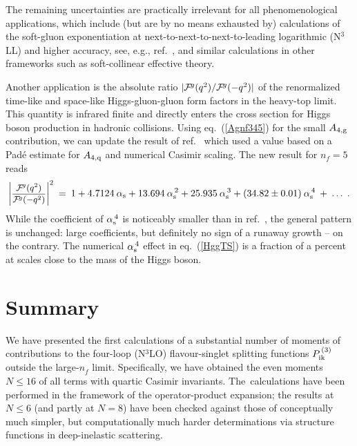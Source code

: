 \documentclass[12pt]{article}
\newcommand{\beq}{\begin{equation}}
\newcommand{\eeq}{\end{equation}}
\newcommand{\als}{\alpha_{\rm s}}
\def\frct#1#2{\mbox{\small{$\displaystyle\frac{#1}{#2}$}}}
\def\as(#1){{\alpha_{\rm s}^{\,#1}}}
\def\nf{{n^{}_{\! f}}}
\begin{document}
The remaining uncertainties are practically irrelevant for all phenomenological
applications, which include (but are by no means exhausted by) calculations of 
the soft-gluon exponentiation at  next-to-next-to-next-to-leading logarithmic 
(N$^3$LL) \cite{n3llSGE} and higher accuracy, see, e.g., ref.~\cite{dFMMV}, 
and similar calculations in other frameworks such as soft-collinear 
effective theory.
 
Another application is the absolute ratio
$|{\cal F}^{\! g}(q^2)/{\cal F}^{\! g}(-q^2)|$ of the renormalized time-like
and space-like Higgs-gluon-gluon form factors in the heavy-top limit. 
This quantity is infrared finite and directly enters the cross section for 
Higgs boson production in hadronic collisions. 
Using eq.~(\ref{Agnf345}) for the small $A_{4,\rm g}$ contribution, we can 
update the result of ref.~\cite{MVV9} which used a value based on a Pad\'e 
estimate for $A_{4,\rm q}$ and numerical Casimir scaling. 
The new result for $n_{\!f} = 5$ reads
%
\beq
\label{HggTS}
  \bigg| \frct{{\cal F}^{\! g}(q^2)}{{\cal F}^{\! g}(-q^2)} \bigg|^2 
  \: = \:
        1 + 4.7124\: \als   + 13.694\: \as(2)
          + 25.935\: \as(3) + (34.82 \pm 0.01)\: \as(4) 
          \:+\: \ldots
\; .
\eeq
%
While the coefficient of $\as(4)$ is noticeably smaller than in 
ref.~\cite{MVV9}, the general pattern is unchanged: large coefficients, 
but definitely no sign of a runaway growth -- on the contrary.
The numerical $\as(4)$ effect in eq.~(\ref{HggTS}) is a fraction of a 
percent at scales close to the mass of the Higgs boson.


%
\setcounter{equation}{0}
\section{Summary}
\label{sec:summ}
\vspace*{-1mm}

We have presented the first calculations of a substantial number of moments 
of contributions to the four-loop (N$^3$LO) flavour-singlet splitting functions 
$P_{\rm ik}^{\,(3)}$ outside the large-$\nf$ limit. 
Specifically, we have obtained the even moments $N\!\leq\!16$ of all terms 
with quartic Casimir invariants.
The~calculations have been performed in the framework of the operator-product
expansion; the results at $N\leq 6$ (and partly at $N=8$) have been 
checked against those of conceptually much simpler, but computationally much 
harder determinations via structure functions in deep-inelastic scattering.
\end{document}
